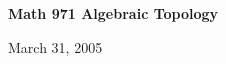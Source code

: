 \def\ccy{\Cyan}		  %
\def\cpb{\ProcessBlue}	  %
\def\csb{\SkyBlue}	  %
\def\ctu{\Turquoise}	  %
\def\ctb{\TealBlue}	  %
\def\caq{\Aquamarine}	  %
\def\cbg{\BlueGreen}	  %
\def\cem{\Emerald}	  %
\def\csg{\SeaGreen}	  %
\def\cgg{\Green}	  %
\def\cfg{\ForestGreen}	  %
\def\cpg{\PineGreen}	  %
\def\clg{\LimeGreen}	  %
\def\cyg{\YellowGreen}	  %
\def\cspg{\SpringGreen}	  %
\def\cog{\OliveGreen}	  %
\def\pars{\RawSienna}	  %
\def\cse{\Sepia}		  %
\def\cbr{\Brown}		  %
\def\cta{\Tan}		  %
\def\cgr{\Gray}		  %
\def\cbl{\Black}		  %
\def\cwh{\White}		  %


\loadmsbm



\def\ctln{\centerline}
\def\u{\underbar}
\def\ssk{\smallskip}
\def\msk{\medskip}
\def\bsk{\bigskip}
\def\hsk{\hskip.1in}
\def\hhsk{\hskip.2in}
\def\dsl{\displaystyle}
\def\hskp{\hskip1.5in}

\def\lra{$\Leftrightarrow$ }
\def\ra{\rightarrow}
\def\mpto{\logmapsto}
\def\pu{\pi_1}
\def\mpu{$\pi_1$}
\def\sig{\Sigma}
\def\msig{$\Sigma$}
\def\ep{\epsilon}
\def\sset{\subseteq}
\def\del{\partial}
\def\inv{^{-1}}
\def\wtl{\widetilde}
\def\lra{\Leftrightarrow}
\def\del{\partial}
\def\delp{\partial^\prime}
\def\delpp{\partial^{\prime\prime}}
\def\sgn{{\roman{sgn}}}



\ctln{\bf Math 971 Algebraic Topology}

\ssk

\ctln{March 31, 2005}

\msk

